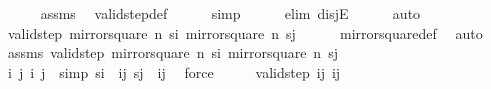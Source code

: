 \begin{isabellebody}
\ \ \ \ \isamarkupfalse%
\ assms\ \isamarkupfalse%
\ valid{\isacharunderscore}{\kern0pt}step{\isacharunderscore}{\kern0pt}def\isanewline
\ \ \ \ \isamarkupfalse%
\ simp\isanewline
\ \ \ \ \isamarkupfalse%
\ {\isacharparenleft}{\kern0pt}elim\ disjE{\isacharparenright}{\kern0pt}\isanewline
\ \ \ \ \isamarkupfalse%
\ auto\isanewline
\ \ \ \ \isamarkupfalse%
\isanewline
\ \ \isamarkupfalse%
\ \isamarkupfalse%
\ {\isachardoublequoteopen}valid{\isacharunderscore}{\kern0pt}step\ {\isacharparenleft}{\kern0pt}mirror{}{\isacharunderscore}{\kern0pt}square\ n\ s\isactrlsub i{\isacharparenright}{\kern0pt}\ {\isacharparenleft}{\kern0pt}mirror{}{\isacharunderscore}{\kern0pt}square\ n\ s\isactrlsub j{\isacharparenright}{\kern0pt}{\isachardoublequoteclose}\isanewline
\ \ \ \ \isamarkupfalse%
\ mirror{}{\isacharunderscore}{\kern0pt}square{\isacharunderscore}{\kern0pt}def\ \isamarkupfalse%
\ auto\isanewline
{}\isamarkupfalse%
\isanewline
\ \ \isamarkupfalse%
\ assms{\isacharcolon}{\kern0pt}\ {\isachardoublequoteopen}valid{\isacharunderscore}{\kern0pt}step\ {\isacharparenleft}{\kern0pt}mirror{}{\isacharunderscore}{\kern0pt}square\ n\ s\isactrlsub i{\isacharparenright}{\kern0pt}\ {\isacharparenleft}{\kern0pt}mirror{}{\isacharunderscore}{\kern0pt}square\ n\ s\isactrlsub j{\isacharparenright}{\kern0pt}{\isachardoublequoteclose}\isanewline
\ \ \isamarkupfalse%
\ i\ j\ i{\isacharprime}{\kern0pt}\ j{\isacharprime}{\kern0pt}\ \ {\isacharbrackleft}{\kern0pt}simp{\isacharbrackright}{\kern0pt}{\isacharcolon}{\kern0pt}\ {\isachardoublequoteopen}s\isactrlsub i\ {\isacharequal}{\kern0pt}\ {\isacharparenleft}{\kern0pt}i{\isacharcomma}{\kern0pt}j{\isacharparenright}{\kern0pt}{\isachardoublequoteclose}\ {\isachardoublequoteopen}s\isactrlsub j\ {\isacharequal}{\kern0pt}\ {\isacharparenleft}{\kern0pt}i{\isacharprime}{\kern0pt}{\isacharcomma}{\kern0pt}j{\isacharprime}{\kern0pt}{\isacharparenright}{\kern0pt}{\isachardoublequoteclose}\ \isamarkupfalse%
\ force\isanewline
\ \ \isamarkupfalse%
\ \isamarkupfalse%
\ {\isachardoublequoteopen}valid{\isacharunderscore}{\kern0pt}step\ {\isacharparenleft}{\kern0pt}i{\isacharcomma}{\kern0pt}j{\isacharparenright}{\kern0pt}\ {\isacharparenleft}{\kern0pt}i{\isacharprime}{\kern0pt}{\isacharcomma}{\kern0pt}j{\isacharprime}{\kern0pt}{\isacharparenright}{\kern0pt}{\isachardoublequoteclose}\isanewline

\end{isabellebody}
